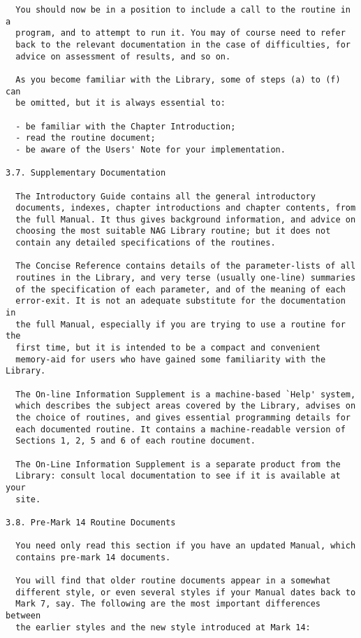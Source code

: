 \begin{verbatim}
  You should now be in a position to include a call to the routine in a
  program, and to attempt to run it. You may of course need to refer
  back to the relevant documentation in the case of difficulties, for
  advice on assessment of results, and so on.
 
  As you become familiar with the Library, some of steps (a) to (f) can
  be omitted, but it is always essential to:
 
  - be familiar with the Chapter Introduction;
  - read the routine document;
  - be aware of the Users' Note for your implementation.
 
3.7. Supplementary Documentation
 
  The Introductory Guide contains all the general introductory
  documents, indexes, chapter introductions and chapter contents, from
  the full Manual. It thus gives background information, and advice on
  choosing the most suitable NAG Library routine; but it does not
  contain any detailed specifications of the routines.
 
  The Concise Reference contains details of the parameter-lists of all
  routines in the Library, and very terse (usually one-line) summaries
  of the specification of each parameter, and of the meaning of each
  error-exit. It is not an adequate substitute for the documentation in
  the full Manual, especially if you are trying to use a routine for the
  first time, but it is intended to be a compact and convenient
  memory-aid for users who have gained some familiarity with the Library.
 
  The On-line Information Supplement is a machine-based `Help' system,
  which describes the subject areas covered by the Library, advises on
  the choice of routines, and gives essential programming details for
  each documented routine. It contains a machine-readable version of
  Sections 1, 2, 5 and 6 of each routine document.
 
  The On-Line Information Supplement is a separate product from the
  Library: consult local documentation to see if it is available at your
  site.
 
3.8. Pre-Mark 14 Routine Documents
 
  You need only read this section if you have an updated Manual, which
  contains pre-mark 14 documents.
 
  You will find that older routine documents appear in a somewhat
  different style, or even several styles if your Manual dates back to
  Mark 7, say. The following are the most important differences between
  the earlier styles and the new style introduced at Mark 14:
 

\end{verbatim}
